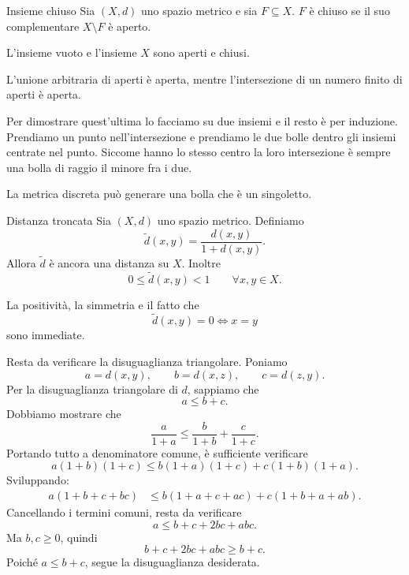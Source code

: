 \documentclass[a4paper]{article}
\begin{document}
\begin{snippetdefinition}{Insieme chiuso}
    Sia \((X,d)\) uno spazio metrico e sia \(F\subseteq X\).
    \(F\) è chiuso se il suo complementare \(X\setminus F\) è aperto.
\end{snippetdefinition}

L'insieme vuoto e l'insieme \(X\) sono aperti e chiusi.

\begin{snippetproposition}{}
    L'unione arbitraria di aperti è aperta, mentre l'intersezione di un numero finito di aperti è aperta.
\end{snippetproposition}

\begin{snippetproof}{}
    Per dimostrare quest'ultima lo facciamo su due insiemi e il resto è per induzione.
    Prendiamo un punto nell'intersezione e prendiamo le due bolle dentro gli insiemi centrate
    nel punto. Siccome hanno lo stesso centro la loro intersezione è sempre una bolla di raggio
    il minore fra i due.
\end{snippetproof}

La metrica discreta può generare una bolla che è un singoletto.


\begin{snippetproposition}{Distanza troncata}
    Sia \((X,d)\) uno spazio metrico. Definiamo
    \[
        \widetilde d(x,y)
        =
        \frac{d(x,y)}{1+d(x,y)}.
    \]
    Allora \(\widetilde d\) è ancora una distanza su \(X\). Inoltre
    \[
        0\leq \widetilde d(x,y)<1
        \qquad
        \forall x,y\in X.
    \]
\end{snippetproposition}

\begin{snippetproof}{}
    La positività, la simmetria e il fatto che
    \[
        \widetilde d(x,y)=0
        \iff
        x=y
    \]
    sono immediate.

    Resta da verificare la disuguaglianza triangolare. Poniamo
    \[
        a=d(x,y),
        \qquad
        b=d(x,z),
        \qquad
        c=d(z,y).
    \]
    Per la disuguaglianza triangolare di \(d\), sappiamo che
    \[
        a\leq b+c.
    \]
    Dobbiamo mostrare che
    \[
        \frac{a}{1+a}
        \leq
        \frac{b}{1+b}
        +
        \frac{c}{1+c}.
    \]
    Portando tutto a denominatore comune, è sufficiente verificare
    \[
        a(1+b)(1+c)
        \leq
        b(1+a)(1+c)+c(1+b)(1+a).
    \]
    Sviluppando:
    \begin{align*}
        a(1+b+c+bc)
        &\leq
        b(1+a+c+ac)+c(1+b+a+ab).
    \end{align*}
    Cancellando i termini comuni, resta da verificare
    \[
        a\leq b+c+2bc+abc.
    \]
    Ma \(b,c\geq 0\), quindi
    \[
        b+c+2bc+abc\geq b+c.
    \]
    Poiché \(a\leq b+c\), segue la disuguaglianza desiderata.
\end{snippetproof}
\end{document}
